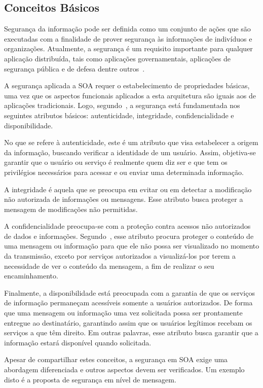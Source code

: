 \subsection{Conceitos Básicos}

Segurança da informação pode ser definida como um conjunto de ações que são executadas com a finalidade de prover segurança às informações de indivíduos e organizações. Atualmente, a segurança é um requisito importante para qualquer aplicação distribuída, tais como aplicações governamentais, aplicações de segurança pública e de defesa dentre outros~\cite{Bertino2010}.

A segurança aplicada a SOA requer o estabelecimento de propriedades básicas, uma vez que os aspectos funcionais aplicados a esta arquitetura são iguais aos de aplicações tradicionais.  Logo, segundo~\cite{Verissimo2001}, a segurança está fundamentada nos seguintes atributos básicos: autenticidade, integridade, confidencialidade e disponibilidade.

No que se refere à autenticidade, este é um atributo que visa estabelecer a origem da informação, buscando verificar a identidade de um usuário. Assim, objetiva-se garantir que o usuário ou serviço é realmente quem diz ser e que tem os privilégios necessários para acessar e ou enviar uma determinada informação.

A integridade é aquela que se preocupa em evitar ou em detectar a modificação não autorizada de informações ou mensagens. Esse atributo busca proteger a mensagem de modificações não permitidas.

A confidencialidade preocupa-se com a proteção contra acessos não autorizados de dados e informações. Segundo~\cite{Bertino2010}, esse atributo procura proteger o conteúdo de uma mensagem ou informação  para que ele não possa ser visualizado no momento da transmissão, exceto por serviços autorizados a visualizá-los por terem a necessidade de ver o conteúdo da mensagem, a fim de realizar o seu encaminhamento.

Finalmente, a disponibilidade está preocupada com a garantia de que os serviços de informação permaneçam acessíveis somente a usuários autorizados. De forma que uma mensagem ou informação uma vez solicitada possa ser prontamente entregue ao destinatário, garantindo assim que os usuários legítimos recebam os serviços a que têm direito. Em outras palavras, esse atributo busca garantir que a informação estará disponível quando solicitada.

Apesar de compartilhar estes conceitos,  a segurança em SOA exige uma abordagem  diferenciada e outros aspectos devem ser verificados. Um exemplo disto é a proposta de segurança em nível de mensagem.

